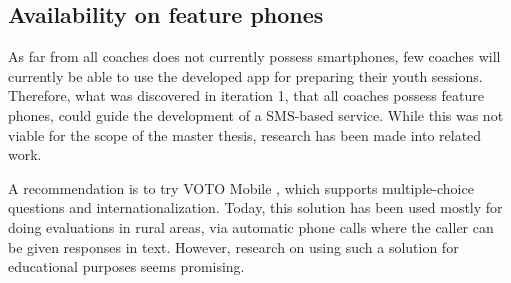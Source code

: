 \subsection{Availability on feature phones}
As far from all coaches does not currently possess smartphones, few coaches will currently be able to use the developed app for preparing their youth sessions. Therefore, what was discovered in iteration 1, that all coaches possess feature phones, could guide the development of a SMS-based service. While this was not viable for the scope of the master thesis, research has been made into related work.

A recommendation is to try VOTO Mobile \cite{voto-mobile}, which supports multiple-choice questions and internationalization. Today, this solution has been used mostly for doing evaluations in rural areas, via automatic phone calls where the caller can be given responses in text. However, research on using such a solution for educational purposes seems promising.
